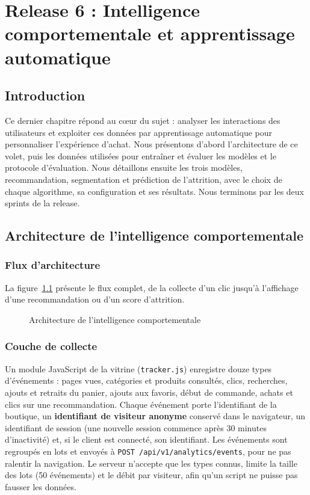 \thispagestyle{fancy}
\chapter{Release 6 : Intelligence comportementale et apprentissage automatique}
\section*{Introduction}
Ce dernier chapitre répond au cœur du sujet : analyser les interactions des utilisateurs et exploiter ces données par apprentissage automatique pour personnaliser l'expérience d'achat. Nous présentons d'abord l'architecture de ce volet, puis les données utilisées pour entraîner et évaluer les modèles et le protocole d'évaluation. Nous détaillons ensuite les trois modèles, recommandation, segmentation et prédiction de l'attrition, avec le choix de chaque algorithme, sa configuration et ses résultats. Nous terminons par les deux sprints de la release.

\section{Architecture de l'intelligence comportementale}
\subsection{Flux d'architecture}
La figure~\ref{fig:archi-ml} présente le flux complet, de la collecte d'un clic jusqu'à l'affichage d'une recommandation ou d'un score d'attrition.
\begin{figure}[H]
    \centering
    \caption{Architecture de l'intelligence comportementale}
    \label{fig:archi-ml}
\end{figure}

\subsection{Couche de collecte}
Un module JavaScript de la vitrine (\texttt{tracker.js}) enregistre douze types d'événements : pages vues, catégories et produits consultés, clics, recherches, ajouts et retraits du panier, ajouts aux favoris, début de commande, achats et clics sur une recommandation. Chaque événement porte l'identifiant de la boutique, un \textbf{identifiant de visiteur anonyme} conservé dans le navigateur, un identifiant de session (une nouvelle session commence après 30 minutes d'inactivité) et, si le client est connecté, son identifiant. Les événements sont regroupés en lots et envoyés à \texttt{POST /api/v1/analytics/events}, pour ne pas ralentir la navigation. Le serveur n'accepte que les types connus, limite la taille des lots (50 événements) et le débit par visiteur, afin qu'un script ne puisse pas fausser les données.

